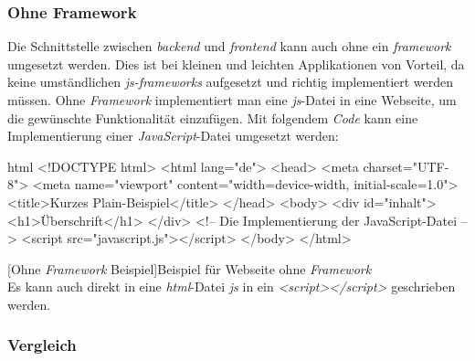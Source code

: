 \subsubsection{Ohne Framework}
Die Schnittstelle zwischen \textit{\Gls{backend}} und \textit{\Gls{frontend}} kann auch ohne ein \textit{\Gls{framework}} umgesetzt werden. Dies ist bei kleinen und leichten Applikationen von Vorteil, da keine umständlichen \textit{\Gls{js}-\Gls{framework}s} aufgesetzt und richtig implementiert werden müssen. Ohne \textit{Framework} implementiert man eine \textit{\Gls{js}}-Datei in eine Webseite, um die gewünschte Funktionalität einzufügen. Mit folgendem \textit{Code} kann eine Implementierung einer \textit{JavaScript}-Datei umgesetzt werden:
\begin{code}{html}
	<!DOCTYPE html>
	<html lang="de">
		<head>
			<meta charset="UTF-8">
			<meta name="viewport" content="width=device-width, initial-scale=1.0">
			<title>Kurzes Plain-Beispiel</title>
		</head>
		<body>
			<div id="inhalt">
				<h1>Überschrift</h1>
			</div>
			<!-- Die Implementierung der JavaScript-Datei -->
			<script src="javascript.js"></script>
		</body>
	</html>
\end{code}
[Ohne \textit{Framework} Beispiel]{Beispiel für Webseite ohne \textit{Framework}}~\\
Es kann auch direkt in eine \textit{\Gls{html}}-Datei \textit{\Gls{js}} in ein \textit{<script></script>} geschrieben werden.
\newpage
\subsubsection{Vergleich}

